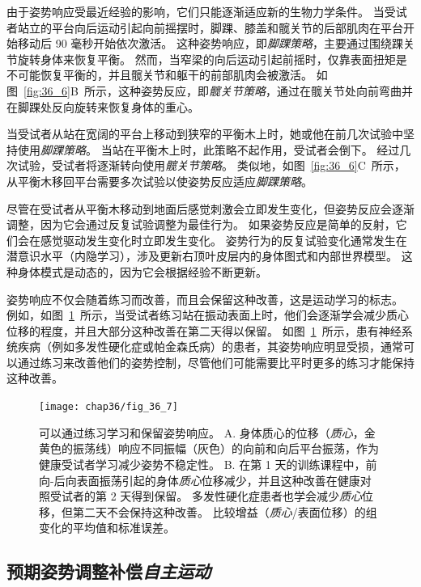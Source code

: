 由于姿势响应受最近经验的影响，它们只能逐渐适应新的生物力学条件。
当受试者站立的平台向后运动引起向前摇摆时，脚踝、膝盖和髋关节的后部肌肉在平台开始移动后 90 毫秒开始依次激活。
这种姿势响应，即\textit{脚踝策略}，主要通过围绕踝关节旋转身体来恢复平衡。
然而，当窄梁的向后运动引起前摇时，仅靠表面扭矩是不可能恢复平衡的，并且髋关节和躯干的前部肌肉会被激活。
如图~\ref{fig:36_6}B~所示，这种姿势反应，即\textit{髋关节策略}，通过在髋关节处向前弯曲并在脚踝处反向旋转来恢复身体的重心。


当受试者从站在宽阔的平台上移动到狭窄的平衡木上时，她或他在前几次试验中坚持使用\textit{脚踝策略}。
当站在平衡木上时，此策略不起作用，受试者会倒下。
经过几次试验，受试者将逐渐转向使用\textit{髋关节策略}。
类似地，如图~\ref{fig:36_6}C~所示，从平衡木移回平台需要多次试验以使姿势反应适应\textit{脚踝策略}。


尽管在受试者从平衡木移动到地面后感觉刺激会立即发生变化，但姿势反应会逐渐调整，因为它会通过反复试验调整为最佳行为。
如果姿势反应是简单的反射，它们会在感觉驱动发生变化时立即发生变化。
姿势行为的反复试验变化通常发生在潜意识水平（内隐学习），涉及更新右顶叶皮层内的身体图式和内部世界模型。
这种身体模式是动态的，因为它会根据经验不断更新。


姿势响应不仅会随着练习而改善，而且会保留这种改善，这是运动学习的标志。
例如，如图~\ref{fig:36_7}~所示，当受试者练习站在振动表面上时，他们会逐渐学会减少质心位移的程度，并且大部分这种改善在第二天得以保留。
如图~\ref{fig:36_7}~所示，患有神经系统疾病（例如多发性硬化症或帕金森氏病）的患者，其姿势响应明显受损，通常可以通过练习来改善他们的姿势控制，尽管他们可能需要比平时更多的练习才能保持这种改善。


\begin{figure}[htbp]
	\centering
	\texttt{[image: chap36/fig\_36\_7]}
	\caption{可以通过练习学习和保留姿势响应。
		A. 身体质心的位移（\textit{质心}，金黄色的振荡线）响应不同振幅（灰色）的向前和向后平台振荡，作为健康受试者学习减少姿势不稳定性。
		B. 在第 1 天的训练课程中，前向-后向表面振荡引起的身体\textit{质心}位移减少，并且这种改善在健康对照受试者的第 2 天得到保留。
		多发性硬化症患者也学会减少\textit{质心}位移，但第二天不会保持这种改善。
		比较增益（\textit{质心}/表面位移）的组变化的平均值和标准误差\cite{gera2016postural}。}
	\label{fig:36_7}
\end{figure}



\subsection{预期姿势调整补偿\textit{自主运动}}

